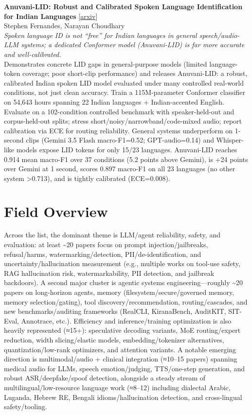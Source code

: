 \documentclass[12pt,letterpaper]{article}
\begin{document}
\medskip

{\small\textbf{Anuvani-LID: Robust and Calibrated Spoken Language Identification for Indian Languages}} {\scriptsize[\href{https://arxiv.org/abs/2610.20263}{arxiv}]}\\
{\scriptsize Stephen Fernandes, Narayan Choudhary}\\

{\small\textit{Spoken language ID is not ``free'' for Indian languages in general speech/audio-LLM systems; a dedicated Conformer model (Anuvani-LID) is far more accurate and well-calibrated.}}\\[1pt]
{\footnotesize Demonstrates concrete LID gaps in general-purpose models (limited language-token coverage; poor short-clip performance) and releases Anuvani-LID: a robust, calibrated Indian spoken LID model evaluated under many controlled real-world conditions, not just clean accuracy. Train a 115M-parameter Conformer classifier on 54,643 hours spanning 22 Indian languages + Indian-accented English. Evaluate on a 102-condition controlled benchmark with speaker-held-out and corpus-held-out splits; stress short/noisy/narrowband/code-mixed audio; report calibration via ECE for routing reliability. General systems underperform on 1-second clips (Gemini 3.5 Flash macro-F1=0.52; GPT-audio=0.14) and Whisper-like models expose LID tokens for only 15/23 languages. Anuvani-LID reaches 0.914 mean macro-F1 over 37 conditions (5.2 points above Gemini), is +24 points over Gemini at 1 second, scores 0.897 macro-F1 on all 23 languages (no other system >0.713), and is tightly calibrated (ECE=0.008).}

\medskip



\section*{Field Overview}
{\footnotesize Across the list, the dominant theme is LLM/agent reliability, safety, and evaluation: at least \textasciitilde{}20 papers focus on prompt injection/jailbreaks, refusal/harms, watermarking/detection, PII/de-identification, and uncertainty/hallucination measurement (e.g., multiple works on tool-use safety, RAG hallucination risk, watermarkability, PII detection, and jailbreak backdoors). A second major cluster is agentic systems engineering---roughly \textasciitilde{}20 papers on long-horizon agents, memory (filesystem/secure/governed memory, memory selection/gating), tool discovery/recommendation, routing/cascades, and new benchmarks/auditing frameworks (RealCLI, KiranaBench, AuditKIT, SIT-Eval, Annotrace, etc.). Efficiency and inference/training optimization is also heavily represented (≈15+): speculative decoding variants, MoE routing/expert reduction, width slicing/elastic models, embedding/tokenizer alternatives, quantization/low-rank optimizers, and attention variants. A notable emerging direction is multimodal/audio + clinical integration (≈10--15 papers) spanning medical audio for LLMs, speech emotion/judging, TTS/one-step generation, and robust ASR/deepfake/spoof detection, alongside a steady stream of multilingual/low-resource language work (≈8--12) including dialectal Arabic, Luganda, Hebrew RE, Bengali idioms/hallucination detection, and cross-lingual safety/tooling.}
\end{document}

